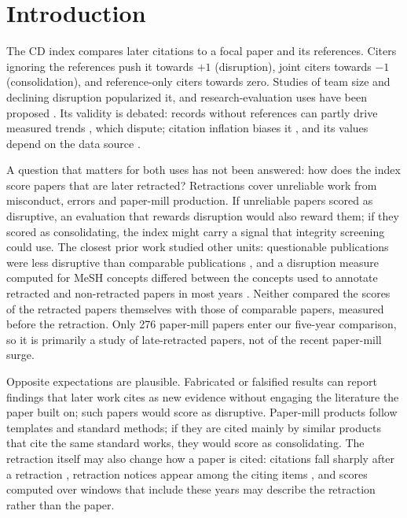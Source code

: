 \section{Introduction}\label{sec:intro}

The CD index \citep{funk2017dynamic} compares later citations to a focal paper and its references.
Citers ignoring the references push it towards $+1$ (disruption), joint citers towards $-1$ (consolidation),
and reference-only citers towards zero. Studies of team size \citep{wu2019large} and declining disruption
\citep{park2023papers} popularized it, and research-evaluation uses have been proposed
\citep{chen2025thresholds}. Its validity is debated: records without references can partly drive measured trends
\citep{holst2024artefacts,holst2026partially}, which \citet{park2025robust,park2026reply} dispute; citation inflation biases it
\citep{petersen2024inflation,petersen2025reanalysis}, and its values depend on the data source
\citep{leibel2023overview,xu2025alternative}.

A question that matters for both uses has not been answered: how does the index score papers that are later
retracted? Retractions cover unreliable work from misconduct, errors and paper-mill production.
If unreliable papers scored as disruptive, an evaluation that rewards disruption would also reward them; if they
scored as consolidating, the index might carry a signal that integrity screening could use. The closest prior work
studied other units: questionable publications were less disruptive than comparable publications
\citep{you2022questionable}, and a disruption measure computed for MeSH concepts differed between the concepts used to
annotate retracted and non-retracted papers in most years \citep{copara2024mesh}. Neither compared the scores of the
retracted papers themselves with those of comparable papers, measured before the retraction.
Only 276 paper-mill papers enter our five-year comparison, so it is primarily a study of late-retracted papers,
not of the recent paper-mill surge.

Opposite expectations are plausible. Fabricated or falsified results can report findings that later work cites as new
evidence without engaging the literature the paper built on; such papers would score as disruptive. Paper-mill products
follow templates and standard methods; if they are cited mainly by similar products that cite the same standard works,
they would score as consolidating. The retraction itself may also change how a paper is cited: citations fall sharply
after a retraction \citep{azoulay2015retractions}, retraction notices appear among the citing items
\citep{hsiao2021continued}, and scores computed over windows that include these years may describe the retraction
rather than the paper.


